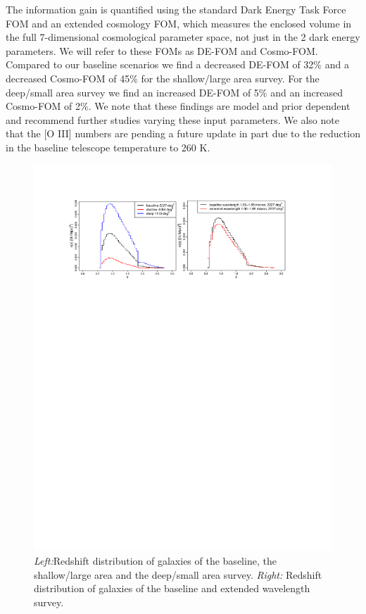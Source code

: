 The information gain is quantified using the standard Dark Energy Task Force FOM and an extended cosmology FOM, which measures the enclosed volume in the full 7-dimensional cosmological parameter space, not just in the 2 dark energy parameters. We will refer to these FOMs as DE-FOM and Cosmo-FOM. Compared to our baseline scenarios we find a decreased DE-FOM of 32\% and a decreased Cosmo-FOM of 45\% for the shallow/large area survey. For the deep/small area survey we find an increased DE-FOM of 5\% and an increased Cosmo-FOM of 2\%. We note that these findings are model and prior dependent and recommend further studies varying these input parameters. We also note that the [O III] numbers are pending a future update in part due to the reduction in the baseline telescope temperature to 260 K.
\begin{figure}
  \includegraphics[width=16.0cm]{Plots/forecasts/HLSS_forecasts}
    \caption{\textit{Left:}Redshift distribution of galaxies of the baseline, the shallow/large area and the deep/small area survey. \textit{Right:} Redshift distribution of galaxies of the baseline and extended wavelength survey.
}
  \label{fi:forecast1}
\end{figure}


